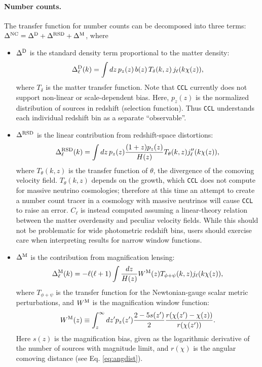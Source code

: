 \documentclass[\docopts]{\docclass}
\newcommand{\ccl}{{\tt CCL}\xspace}
\begin{document}
\paragraph{\bf Number counts.} The transfer function for number counts can be decomposed into three terms: $\Delta^{\rm NC}=\Delta^{\rm D}+\Delta^{\rm RSD}+\Delta^{\rm M}$, where
\begin{itemize}
  \item $\Delta^{\rm D}$ is the standard density term proportional to the matter density:
        \begin{equation}
          \Delta^{\rm D}_\ell(k)=\int dz\,p_z(z)\,b(z)\,T_\delta(k,z)\,j_\ell(k\chi(z)),
        \end{equation}
        where $T_\delta$ is the matter transfer function. Note that \ccl currently does not support non-linear or scale-dependent bias. Here, $p_z(z)$ is the normalized distribution of sources in redshift (selection function). Thus \ccl understands each individual redshift bin as a separate ``observable''.
  \item $\Delta^{\rm RSD}$ is the linear contribution from redshift-space distortions:
        \begin{equation}
          \Delta^{\rm RSD}_\ell(k)=\int dz\,p_z(z)\frac{(1+z) p_z(z)}{H(z)}T_\theta(k,z) j_\ell''(k\chi(z)),
        \end{equation}
        where $T_\theta(k,z)$ is the transfer function of $\theta$, the divergence of the comoving velocity field. $T_\theta(k,z)$ depends on the growth, which \ccl does not compute for massive neutrino cosmologies; therefore at this time an attempt to create a number count tracer in a cosmology with massive neutrinos will cause \ccl to raise an error. $C_\ell$ is instead computed assuming a linear-theory relation between the matter overdensity and peculiar velocity fields. While this should not be problematic for wide photometric redshift bins, users should exercise care when interpreting results for narrow window functions. 
  \item $\Delta^{\rm M}$ is the contribution from magnification lensing:
        \begin{equation}
          \Delta_\ell^{\rm M}(k)=-\ell(\ell+1)\int \frac{dz}{H(z)} W^{\rm M}(z) T_{\phi+\psi}(k,z) j_\ell(k\chi(z)),
        \end{equation}
        where $T_{\phi+\psi}$ is the transfer function for the Newtonian-gauge scalar metric perturbations, and $W^{\rm M}$ is the magnification window function:
        \begin{equation}
           W^{\rm M}(z)\equiv\int_z^\infty dz' p_z(z')\frac{2-5s(z')}{2}\frac{r(\chi(z')-\chi(z))}{r(\chi(z'))}.
        \end{equation}
        Here $s(z)$ is the magnification bias, given as the logarithmic derivative of the number of sources with magnitude limit, and $r(\chi)$ is the angular comoving distance (see Eq. \ref{eq:angdist}).


\end{itemize}
\end{document}
